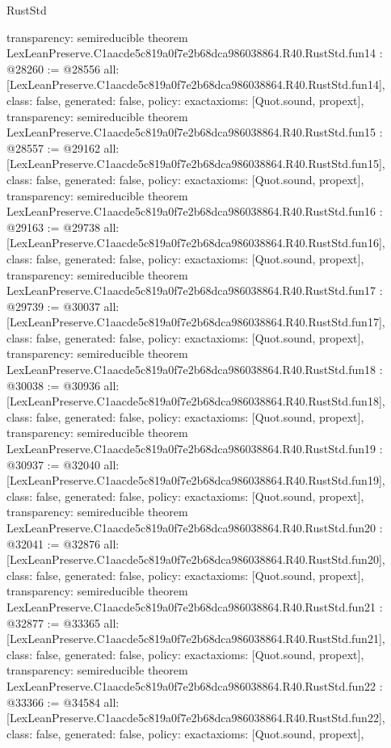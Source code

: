 \begin{lexlean}{RustStd}
\begin{coremodule}
{  transparency: semireducible
}
theorem LexLeanPreserve.C1aacde5c819a0f7e2b68dca986038864.R40.RustStd.fun14 : @28260 := @28556 {
  all: [LexLeanPreserve.C1aacde5c819a0f7e2b68dca986038864.R40.RustStd.fun14],
  class: false,
  generated: false,
  policy: exact{axioms: [Quot.sound, propext]},
  transparency: semireducible
}
theorem LexLeanPreserve.C1aacde5c819a0f7e2b68dca986038864.R40.RustStd.fun15 : @28557 := @29162 {
  all: [LexLeanPreserve.C1aacde5c819a0f7e2b68dca986038864.R40.RustStd.fun15],
  class: false,
  generated: false,
  policy: exact{axioms: [Quot.sound, propext]},
  transparency: semireducible
}
theorem LexLeanPreserve.C1aacde5c819a0f7e2b68dca986038864.R40.RustStd.fun16 : @29163 := @29738 {
  all: [LexLeanPreserve.C1aacde5c819a0f7e2b68dca986038864.R40.RustStd.fun16],
  class: false,
  generated: false,
  policy: exact{axioms: [Quot.sound, propext]},
  transparency: semireducible
}
theorem LexLeanPreserve.C1aacde5c819a0f7e2b68dca986038864.R40.RustStd.fun17 : @29739 := @30037 {
  all: [LexLeanPreserve.C1aacde5c819a0f7e2b68dca986038864.R40.RustStd.fun17],
  class: false,
  generated: false,
  policy: exact{axioms: [Quot.sound, propext]},
  transparency: semireducible
}
theorem LexLeanPreserve.C1aacde5c819a0f7e2b68dca986038864.R40.RustStd.fun18 : @30038 := @30936 {
  all: [LexLeanPreserve.C1aacde5c819a0f7e2b68dca986038864.R40.RustStd.fun18],
  class: false,
  generated: false,
  policy: exact{axioms: [Quot.sound, propext]},
  transparency: semireducible
}
theorem LexLeanPreserve.C1aacde5c819a0f7e2b68dca986038864.R40.RustStd.fun19 : @30937 := @32040 {
  all: [LexLeanPreserve.C1aacde5c819a0f7e2b68dca986038864.R40.RustStd.fun19],
  class: false,
  generated: false,
  policy: exact{axioms: [Quot.sound, propext]},
  transparency: semireducible
}
theorem LexLeanPreserve.C1aacde5c819a0f7e2b68dca986038864.R40.RustStd.fun20 : @32041 := @32876 {
  all: [LexLeanPreserve.C1aacde5c819a0f7e2b68dca986038864.R40.RustStd.fun20],
  class: false,
  generated: false,
  policy: exact{axioms: [Quot.sound, propext]},
  transparency: semireducible
}
theorem LexLeanPreserve.C1aacde5c819a0f7e2b68dca986038864.R40.RustStd.fun21 : @32877 := @33365 {
  all: [LexLeanPreserve.C1aacde5c819a0f7e2b68dca986038864.R40.RustStd.fun21],
  class: false,
  generated: false,
  policy: exact{axioms: [Quot.sound, propext]},
  transparency: semireducible
}
theorem LexLeanPreserve.C1aacde5c819a0f7e2b68dca986038864.R40.RustStd.fun22 : @33366 := @34584 {
  all: [LexLeanPreserve.C1aacde5c819a0f7e2b68dca986038864.R40.RustStd.fun22],
  class: false,
  generated: false,
  policy: exact{axioms: [Quot.sound, propext]},
}
\end{coremodule}
\end{lexlean}
